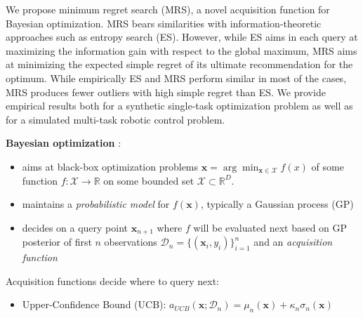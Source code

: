 

\begin{block}{}
\justifying
We propose minimum regret search (MRS), a novel acquisition function for Bayesian
optimization. MRS bears similarities with information-theoretic approaches
such as entropy search (ES). However, while ES aims in each query at maximizing the
information gain with respect to the global maximum, MRS aims at minimizing the
expected simple regret of its ultimate recommendation for the optimum. While empirically ES and MRS perform similar in most of the
cases, MRS produces fewer outliers with high simple regret than ES. We provide empirical
results both for a synthetic single-task optimization problem as well as for a
simulated multi-task robotic control problem.
\end{block}

\begin{block}{}
\textbf{Bayesian optimization} \cite{shahriari_taking_2016}:
\begin{itemize}
\item aims at black-box optimization problems $\mathbf{x} = \arg\min_{\mathbf{x} \in \mathcal{X}} f(x)$ of some function $f: \mathcal{X} \to \mathbb{R}$ on some bounded set $\mathcal{X} \subset \mathbb{R}^D$.
\item maintains a \emph{probabilistic model} for $f(\mathbf{x})$, typically a Gaussian process (GP)
\item decides on a query point $\mathbf{x}_{n+1}$ where $f$ will be evaluated next based on GP posterior of first $n$ observations $\mathcal{D}_n=\{(\mathbf{x}_i, y_i)\}_{i=1}^n$ and an \emph{acquisition function}
\end{itemize}

Acquisition functions decide where to query next:
\begin{itemize}
\item Upper-Confidence Bound (UCB): $a_{UCB}(\mathbf{x};
\mathcal{D}_n) = \mu_{n}(\mathbf{x}) + \kappa_n \sigma_{n}(\mathbf{x})$
\end{itemize}

\end{block}

